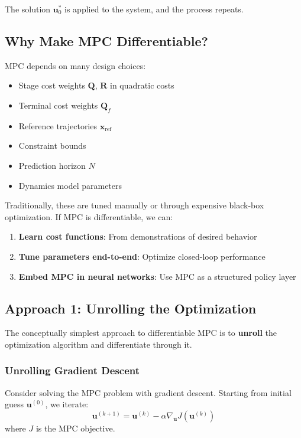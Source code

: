 The solution $\mathbf{u}_0^*$ is applied to the system, and the process repeats.

\subsection{Why Make MPC Differentiable?}

MPC depends on many design choices:
\begin{itemize}
    \item Stage cost weights $\mathbf{Q}$, $\mathbf{R}$ in quadratic costs
    \item Terminal cost weights $\mathbf{Q}_f$
    \item Reference trajectories $\mathbf{x}_{\text{ref}}$
    \item Constraint bounds
    \item Prediction horizon $N$
    \item Dynamics model parameters
\end{itemize}

Traditionally, these are tuned manually or through expensive black-box optimization. If MPC is differentiable, we can:
\begin{enumerate}
    \item \textbf{Learn cost functions}: From demonstrations of desired behavior
    \item \textbf{Tune parameters end-to-end}: Optimize closed-loop performance
    \item \textbf{Embed MPC in neural networks}: Use MPC as a structured policy layer
\end{enumerate}

\subsection{Approach 1: Unrolling the Optimization}

The conceptually simplest approach to differentiable MPC is to \textbf{unroll} the optimization algorithm and differentiate through it.

\subsubsection{Unrolling Gradient Descent}

Consider solving the MPC problem with gradient descent. Starting from initial guess $\mathbf{u}^{(0)}$, we iterate:
\begin{equation}
\mathbf{u}^{(k+1)} = \mathbf{u}^{(k)} - \alpha \nabla_{\mathbf{u}} J(\mathbf{u}^{(k)})
\end{equation}
where $J$ is the MPC objective.


